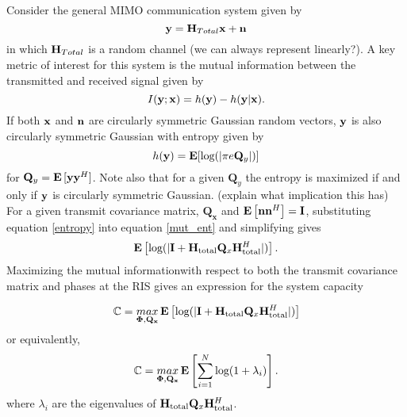 Consider the general MIMO communication system given by 
	\begin{equation}\label{com_system}
	\mathbf{y} = \mathbf{H}_{Total}\mathbf{x} + \mathbf{n}
	\end{equation}
	in which $\mathbf{H}_{Total}$ is a random channel (we can always represent linearly?).
A key metric of interest for this system is the mutual information between the transmitted and received signal given by 
\begin{equation}\label{mut_ent}
I(\mathbf{y};\mathbf{x}) = h(\mathbf{y}) - h(\mathbf{y}|\mathbf{x}).
\end{equation}
If both $\mathbf{x}$ and $\mathbf{n}$ are circularly symmetric Gaussian random vectors, $\mathbf{y}$ is also circularly symmetric Gaussian with entropy given by \cite{telatar1999capacity} 
\begin{equation}\label{entropy}
h(\mathbf{y}) = \mathop{\bf E{}}[\text{log{}}(|\pi e \mathbf{Q}_{y}|)]
\end{equation}
 for $\mathbf{Q}_{y} = \mathop{\bf E{}}{[\mathbf{y} \mathbf{y}^H]}$. Note also that for a given $\mathbf{Q}_{y}$ the entropy is maximized if and only if $\mathbf{y}$ is circularly symmetric Gaussian. (explain what implication this has)
For a given transmit covariance matrix, $\mathbf{Q_x}$ and $\mathop{\bf E{}}\left[\mathbf{n}\mathbf{n}^H \right] = \mathbf{I}$, substituting equation \eqref{entropy} into equation
\eqref{mut_ent} and simplifying gives
\begin{equation}\label{mut_inf}
\mathop{\bf E{}} \left[\text{log{}}(|\mathbf{I} + \mathbf{H}_\text{total} \mathbf{Q}_x \mathbf{H}_\text{total}^H|)\right].
\end{equation}
Maximizing the mutual informationwith respect to both the
transmit covariance matrix and phases at the RIS gives an expression for the system capacity

\begin{equation}\label{capacity}
\mathbb{C} = \underset{\boldsymbol{\Phi},\mathbf{Q_x}}{\mathop{max}} \mathop{\bf E{}} \left[\text{log{}}(|\mathbf{I} + \mathbf{H}_\text{total} \mathbf{Q}_x \mathbf{H}_\text{total}^H|)\right]
\end{equation}
or equivalently,
\begin{equation}\label{capacity_tricky}
\mathbb{C} = \underset{\boldsymbol{\Phi},\mathbf{Q_x}}{\mathop{max}} \mathop{\bf E{}} \left[\sum_{i=1}^{N}\text{log{}}(1 + \lambda_i)\right].
\end{equation}
where $\lambda_i$ are the eigenvalues of $\mathbf{H}_\text{total} \mathbf{Q}_x \mathbf{H}_\text{total}^H$.

